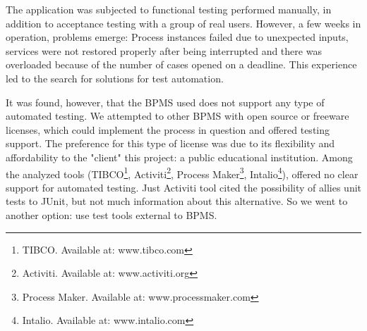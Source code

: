 \documentclass[runningheads,a4paper]{llncs}
\begin{document}
The application was subjected to functional testing performed manually, in addition to acceptance testing with a group of real users. However, a few weeks in operation, problems emerge: Process instances failed due to unexpected inputs, services were not restored properly after being interrupted and there was overloaded because of the number of cases opened on a deadline. This experience led to the search for solutions for test automation.

It was found, however, that the BPMS used does not support any type of automated testing. We attempted to other BPMS with open source or freeware licenses, which could implement the process in question and offered testing support. The preference for this type of license was due to its flexibility and affordability to the "client" this project: a public educational institution.
Among the analyzed tools (TIBCO\footnote{TIBCO. Available at: www.tibco.com}, Activiti\footnote{Activiti. Available at: www.activiti.org}, Process Maker\footnote{Process Maker. Available at: www.processmaker.com}, Intalio\footnote{Intalio. Available at: www.intalio.com}), offered no clear support for automated testing. Just Activiti tool cited the possibility of allies unit tests to JUnit, but not much information about this alternative. So we went to another option: use test tools external to BPMS.
\end{document}
